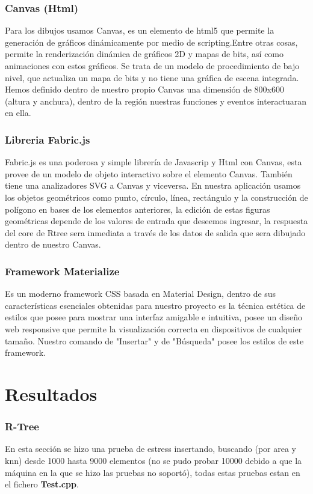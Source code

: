 \documentclass[a4paper]{article}
\begin{document}
\subsubsection{Canvas (Html)}
Para los dibujos usamos Canvas, es un elemento de html5 que permite la generación de gráficos dinámicamente por medio de scripting.Entre otras cosas, permite la renderización  dinámica de gráficos 2D y mapas de bits, así como animaciones con estos gráficos. Se trata de un modelo de procedimiento de bajo nivel, que actualiza un mapa de bits y no tiene una gráfica de escena integrada.
Hemos definido dentro de nuestro propio Canvas una dimensión de 800x600 (altura y anchura), dentro de la región nuestras funciones y eventos interactuaran en ella. 

\subsubsection{Libreria Fabric.js}
Fabric.js es una poderosa y simple librería de Javascrip y Html con Canvas, esta  provee de un modelo de objeto interactivo sobre el elemento  Canvas. También tiene una analizadores SVG a Canvas y viceversa. 
En nuestra aplicación usamos los objetos geométricos como punto, círculo, línea, rectángulo y la construcción de polígono en bases de los elementos anteriores, la edición de estas figuras geométricas depende de los valores de entrada que deseemos ingresar, la respuesta del core de Rtree sera inmediata a través de los datos de salida que sera dibujado dentro de nuestro Canvas.
\subsubsection{Framework Materialize}
Es un moderno framework CSS basada en Material Design, dentro de sus características esenciales obtenidas para nuestro proyecto es la técnica estética de estilos que posee para mostrar una interfaz amigable e intuitiva, posee un diseño web responsive que permite la visualización correcta en dispositivos de cualquier tamaño. Nuestro comando de "Insertar" y de "Búsqueda" posee los estilos de este framework.

\section{Resultados}

\subsubsection{R-Tree}
En esta sección se hizo una prueba de estress insertando, buscando (por area y knn) desde 1000 hasta 9000 elementos (no se pudo probar 10000 debido a que la máquina en la que se hizo las pruebas no soportó), todas estas pruebas estan en el fichero \textbf{Test.cpp}.
\end{document}
